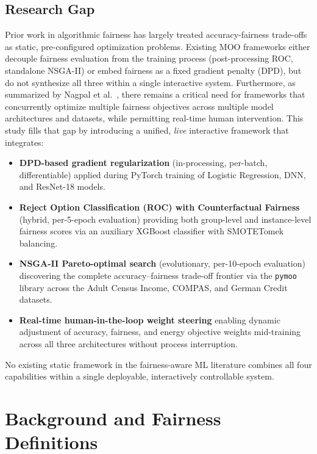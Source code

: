 \documentclass[12pt,a4paper]{article}
\begin{document}
\subsection{Research Gap}
Prior work in algorithmic fairness has largely treated accuracy-fairness trade-offs as static, pre-configured optimization problems. Existing MOO frameworks either decouple fairness evaluation from the training process (post-processing ROC, standalone NSGA-II) or embed fairness as a fixed gradient penalty (DPD), but do not synthesize all three within a single interactive system. Furthermore, as summarized by Nagpal et al.\ \cite{nagpal2024multiobj}, there remains a critical need for frameworks that concurrently optimize multiple fairness objectives across multiple model architectures and datasets, while permitting real-time human intervention.
This study fills that gap by introducing a unified, \emph{live} interactive framework that integrates:
\begin{itemize}[noitemsep]
    \item \textbf{DPD-based gradient regularization} (in-processing, per-batch, differentiable) applied during PyTorch training of Logistic Regression, DNN, and ResNet-18 models.
    \item \textbf{Reject Option Classification (ROC) with Counterfactual Fairness} (hybrid, per-5-epoch evaluation) providing both group-level and instance-level fairness scores via an auxiliary XGBoost classifier with SMOTETomek balancing.
    \item \textbf{NSGA-II Pareto-optimal search} (evolutionary, per-10-epoch evaluation) discovering the complete accuracy–fairness trade-off frontier via the \texttt{pymoo} library across the Adult Census Income, COMPAS, and German Credit datasets.
    \item \textbf{Real-time human-in-the-loop weight steering} enabling dynamic adjustment of accuracy, fairness, and energy objective weights mid-training across all three architectures without process interruption.
\end{itemize}
No existing static framework in the fairness-aware ML literature combines all four capabilities within a single deployable, interactively controllable system.
\section{Background and Fairness Definitions}
\end{document}
